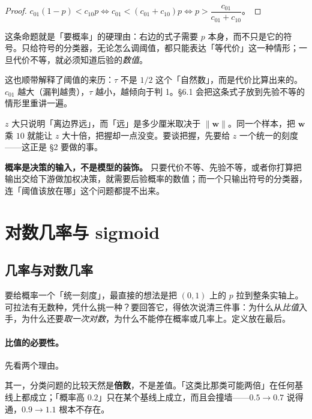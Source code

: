 \documentclass[11pt,a4paper,fontset=windows,zihao=-4]{ctexart}
\newcommand{\bw}{\mathbf{w}}
\newcommand{\norm}[1]{\lVert #1\rVert}
\begin{document}
\begin{proof}
$c_{01}(1-p)<c_{10}p\iff c_{01}<(c_{01}+c_{10})p\iff p>\dfrac{c_{01}}{c_{01}+c_{10}}$。
\end{proof}

这条命题就是「要概率」的硬理由：右边的式子需要 $p$ 本身，而不只是它的符号。只给符号的分类器，无论怎么调阈值，都只能表达「等代价」这一种情形；一旦代价不等，就必须知道后验的\emph{数值}。

这也顺带解释了阈值的来历：$\tau$ 不是 $1/2$ 这个「自然数」，而是代价比算出来的。$c_{01}$ 越大（漏判越贵），$\tau$ 越小，越倾向于判 1。\S6.1 会把这条式子放到先验不等的情形里重讲一遍。

\begin{warn}[「得分大 = 把握大」是错的]
$z$ 大只说明「离边界远」，而「远」是多少厘米取决于 $\norm{\bw}$。同一个样本，把 $\bw$ 乘 $10$ 就能让 $z$ 大十倍，把握却一点没变。要谈把握，先要给 $z$ 一个统一的刻度——这正是 \S2 要做的事。
\end{warn}

\begin{keybox}[本节结论]
\textbf{概率是决策的输入，不是模型的装饰。}
只要代价不等、先验不等，或者你打算把输出交给下游做加权决策，就需要后验概率的数值；而一个只输出符号的分类器，连「阈值该放在哪」这个问题都提不出来。
\end{keybox}


\section{对数几率与 sigmoid}

\subsection{几率与对数几率}

要给概率一个「统一刻度」，最直接的想法是把 $(0,1)$ 上的 $p$ 拉到整条实轴上。可拉法有无数种，凭什么挑一种？要回答它，得依次说清三件事：为什么从\emph{比值}入手，为什么还要\emph{取一次对数}，为什么不能停在概率或几率上。定义放在最后。

\paragraph{比值的必要性。}先看两个理由。

其一，分类问题的比较天然是\textbf{倍数}，不是差值。「这类比那类可能两倍」在任何基线上都成立；「概率高 $0.2$」只在某个基线上成立，而且会撞墙——$0.5\to0.7$ 说得通，$0.9\to1.1$ 根本不存在。
\end{document}
